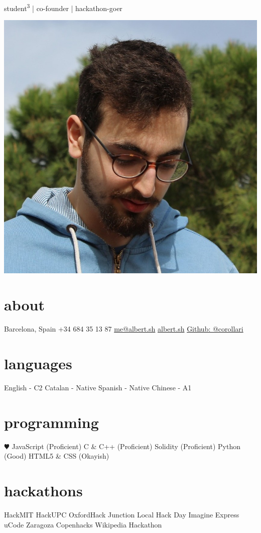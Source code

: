 \documentclass[]{friggeri-cv}
\begin{document}
       {student\textsuperscript{3} | co-founder | hackathon-goer}

\begin{aside}
  \includegraphics[width=\textwidth]{me.jpg}
  \section{about}
    Barcelona, Spain
    +34 684 35 13 87
    \href{mailto:me@albert.sh}{me@albert.sh}
    \href{https://albert.sh}{albert.sh}
    \href{https://github.com/corollari}{Github: @corollari}
  \section{languages}
    English - C2
    Catalan - Native
    Spanish - Native
    Chinese - A1
  \section{programming}
    {\color{red} $\varheartsuit$} JavaScript (Proficient)
    C \& C++ (Proficient)
    Solidity (Proficient)
    Python (Good)
    HTML5 \& CSS (Okayish)
  \section{hackathons}
HackMIT
HackUPC
OxfordHack
Junction
Local Hack Day
Imagine Express
uCode Zaragoza
Copenhacks
Wikipedia Hackathon
\end{aside}
%
\end{document}

